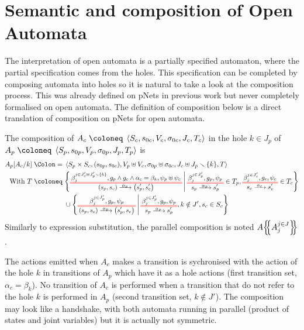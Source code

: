 \documentclass{article}
\begin{document}
\section{Semantic and composition of Open Automata}\label{sec:semcompo}
The interpretation of open automata is a partially specified automaton, where the partial specification comes from the holes.
This specification can be completed by composing automata into holes so it is natural to take a look at the composition process.
This was already defined on pNets in previous work \cite{henrio:01299562} but never completely formalised on open automata.
The  definition of composition below is a direct translation of composition on pNets for open automata.
\begin{defi}
The composition of \(A_c \defobject \OA{S_c}{s_{0c}}{V_c}{\sigma_{0c}}{J_c}{T_c}\) in the hole \(k \in J_p\) of \(A_p \defobject \OA{S_p}{s_{0p}}{V_p}{\sigma_{0p}}{J_p}{T_p}\) is
\begin{align*}
	A_p\subst{A_c}{k} \defnotation & \OA{S_p \times S_c}{\mpar{s_{0p}, s_{0c}}}{V_p \uplus V_c}{\sigma_{0p} \uplus \sigma_{0c}}{J_c \uplus J_p \setminus \mbrc{k}}{T} \\
	\text{With } T \defobject & \mset{\OT{\mpar{s_p, s_c}}{\mpar{s'_p, s'_c}}{\alpha_p}{\beta_j^{j \in J'_c \uplus J'_p \setminus \mbrc{k}}}{g_p \wedge g_c \wedge \alpha_c = \beta_k}{\psi_p \uplus \psi_c}}{\OTx{p}{}{}{p} \in T_p, \OTx{c}{}{}{c} \in T_c} \\
	& \cup \mset{\OT{\mpar{s_p, s_c}}{\mpar{s'_p, s_c}}{\alpha_p}{\beta_j^{j \in J'_p}}{g_p}{\psi_p}}{\OTx{p}{}{}{p}, k \notin J', s_c \in S_c}
\end{align*}
Similarly to expression substitution, the parallel composition is noted \(A{\left\{\!\!{\left\{A_j^{j \in J}\right\}}\!\!\right\}}\).
\end{defi}
The actions emitted when \(A_c\) makes a transition is sychronised with the action of the hole \(k\) in transitions of \(A_p\) which have it as a hole actions (first transition set, \(\alpha_c = \beta_k\)).
No transition of \(A_c\) is performed when a transition that do not refer to the hole \(k\) is performed in \(A_p\) (second transition set, \(k \notin J'\)).
The composition may look like a handshake, with both automata running in parallel (product of states and joint variables) but it is actually not symmetric.
\end{document}
